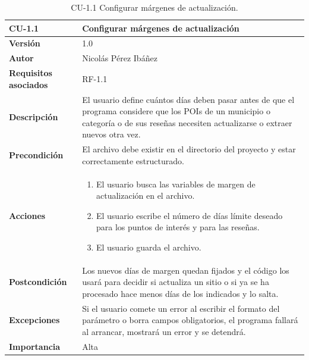 \begin{table}[p]
	\centering
	\begin{tabularx}{\linewidth}{ p{} p{} }
		\toprule
		\textbf{CU-1.1}    & \textbf{Configurar márgenes de actualización}\\
		\toprule
		\textbf{Versión}              & 1.0    \\
		\textbf{Autor}                & Nicolás Pérez Ibáñez \\
		\textbf{Requisitos asociados} & RF-1.1 \\
		\textbf{Descripción}          & El usuario define cuántos días deben pasar antes de que el programa considere que los POIs de un municipio o categoría o de sus reseñas necesiten actualizarse o extraer nuevos otra vez. \\
		\textbf{Precondición}         & El archivo \ruta{config/config.json} debe existir en el directorio del proyecto y estar correctamente estructurado. \\
		\textbf{Acciones}             &
		\begin{enumerate}
			\def\labelenumi{\arabic{enumi}.}
			\tightlist
			\item El usuario busca las variables de margen de actualización en el archivo.
			\item El usuario escribe el número de días límite deseado para los puntos de interés y para las reseñas.
			\item El usuario guarda el archivo.
		\end{enumerate}\\
		\textbf{Postcondición}        & Los nuevos días de margen quedan fijados y el código los usará para decidir si actualiza un sitio o si ya se ha procesado hace menos días de los indicados y lo salta. \\
		\textbf{Excepciones}          & Si el usuario comete un error al escribir el formato del parámetro o borra campos obligatorios, el programa fallará al arrancar, mostrará un error y se detendrá. \\
		\textbf{Importancia}          & Alta \\
		\bottomrule
	\end{tabularx}
	\caption{CU-1.1 Configurar márgenes de actualización.}
\end{table}

